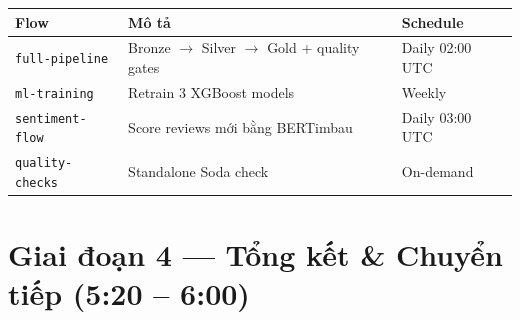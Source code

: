 \documentclass[12pt, a4paper]{article}
\newcommand{\code}[1]{\texttt{\small#1}}
\begin{document}
\begin{tcolorbox}[colback=gray!5, colframe=p2color!50, arc=6pt,
  title={\faSitemap\ Sơ đồ --- Prefect Full Pipeline với Quality Gates}]
\begin{center}
\end{center}

\begin{center}
\small
\begin{tabular}{lll}
\toprule
\textbf{Flow} & \textbf{Mô tả} & \textbf{Schedule} \\
\midrule
\code{full-pipeline}  & Bronze $\to$ Silver $\to$ Gold + quality gates & Daily 02:00 UTC \\
\code{ml-training}    & Retrain 3 XGBoost models                        & Weekly \\
\code{sentiment-flow} & Score reviews mới bằng BERTimbau                & Daily 03:00 UTC \\
\code{quality-checks} & Standalone Soda check                            & On-demand \\
\bottomrule
\end{tabular}
\end{center}
\end{tcolorbox}

\newpage

\section{Giai đoạn 4 --- Tổng kết \& Chuyển tiếp (5:20 -- 6:00)}
\end{document}
